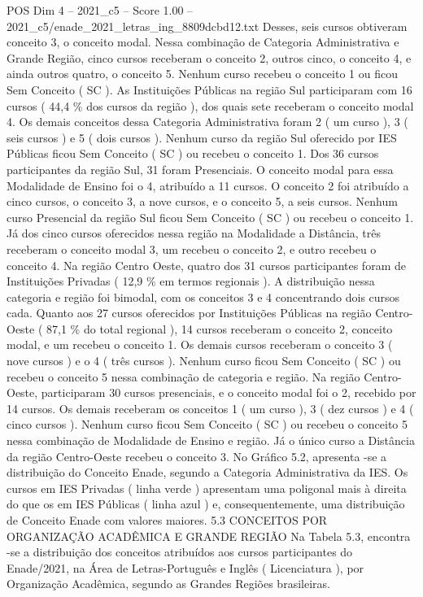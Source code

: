 \begin{textsample}{POS Dim 4 – 2021\_c5 – Score 1.00 – 2021\_c5/enade\_2021\_letras\_ing\_8809dcbd12.txt}
Desses, seis cursos obtiveram conceito 3, o conceito modal.
Nessa combinação de Categoria Administrativa e Grande Região, cinco cursos receberam o conceito 2, outros cinco, o conceito 4, e ainda outros quatro, o conceito 5.
Nenhum curso recebeu o conceito 1 ou ficou Sem Conceito ( SC ).
As Instituições Públicas na região Sul participaram com 16 cursos ( 44,4 \% dos cursos da região ), dos quais sete receberam o conceito modal 4.
Os demais conceitos dessa Categoria Administrativa foram 2 ( um curso ), 3 ( seis cursos ) e 5 ( dois cursos ).
Nenhum curso da região Sul oferecido por IES Públicas ficou Sem Conceito ( SC ) ou recebeu o conceito 1.
Dos 36 cursos participantes da região Sul, 31 foram Presenciais.
O conceito modal para essa Modalidade de Ensino foi o 4, atribuído a 11 cursos.
O conceito 2 foi atribuído a cinco cursos, o conceito 3, a nove cursos, e o conceito 5, a seis cursos.
Nenhum curso Presencial da região Sul ficou Sem Conceito ( SC ) ou recebeu o conceito 1.
Já dos cinco cursos oferecidos nessa região na Modalidade a Distância, três receberam o conceito modal 3, um recebeu o conceito 2, e outro recebeu o conceito 4.
Na região Centro Oeste, quatro dos 31 cursos participantes foram de Instituições Privadas ( 12,9 \% em termos regionais ).
A distribuição nessa categoria e região foi bimodal, com os conceitos 3 e 4 concentrando dois cursos cada.
Quanto aos 27 cursos oferecidos por Instituições Públicas na região Centro-Oeste ( 87,1 \% do total regional ), 14 cursos receberam o conceito 2, conceito modal, e um recebeu o conceito 1.
Os demais cursos receberam o conceito 3 ( nove cursos ) e o 4 ( três cursos ).
Nenhum curso ficou Sem Conceito ( SC ) ou recebeu o conceito 5 nessa combinação de categoria e região.
Na região Centro-Oeste, participaram 30 cursos presenciais, e o conceito modal foi o 2, recebido por 14 cursos.
Os demais receberam os conceitos 1 ( um curso ), 3 ( dez cursos ) e 4 ( cinco cursos ).
Nenhum curso ficou Sem Conceito ( SC ) ou recebeu o conceito 5 nessa combinação de Modalidade de Ensino e região.
Já o único curso a Distância da região Centro-Oeste recebeu o conceito 3.
No Gráfico 5.2, apresenta -se a distribuição do Conceito Enade, segundo a Categoria Administrativa da IES.
Os cursos em IES Privadas ( linha verde ) apresentam uma poligonal mais à direita do que os em IES Públicas ( linha azul ) e, consequentemente, uma distribuição de Conceito Enade com valores maiores. 5.3 CONCEITOS POR ORGANIZAÇÃO ACADÊMICA E GRANDE REGIÃO Na Tabela 5.3, encontra -se a distribuição dos conceitos atribuídos aos cursos participantes do Enade/2021, na Área de Letras-Português e Inglês ( Licenciatura ), por Organização Acadêmica, segundo as Grandes Regiões brasileiras.

\end{textsample}
